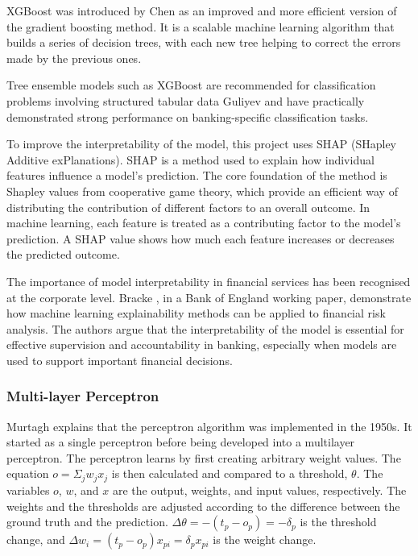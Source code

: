 \documentclass[ %
                    author={Natchalin Iwsakul \\[0.4em] Inkaphol Siriwongwattana \\[0.4em] Tanaphan Kummaraphat \\[0.6em] Patorn Srisupap},,
                supervisor={Fernando Moreno-Pino},
                    degree={MSc},
                     title={Propensity Modelling for SME Commercial Lending Using Open Public Data
},
                  subtitle={Companies House and GDELT as predictors of first-time borrowing},
                      type={},
                      year={2026}]{dissertation}
\begin{document}
XGBoost was introduced by Chen \cite{chen_xgboost_2016} as an
improved and more efficient version of the gradient
boosting method. It is a scalable machine learning
algorithm that builds a series of decision trees, with
each new tree helping to correct the errors made by
the previous ones.

Tree ensemble models such as XGBoost are recommended
for classification problems involving structured tabular
data Guliyev \citep{guliyev_customer_2021} and have practically
demonstrated strong performance on banking-specific
classification tasks.

To improve the interpretability of the model, this
project uses SHAP (SHapley Additive exPlanations).
SHAP is a method used to explain how individual
features influence a model's prediction. The core
foundation of the method is Shapley values from
cooperative game theory, which provide an efficient
way of distributing the contribution of different
factors to an overall outcome. In machine learning,
each feature is treated as a contributing factor to
the model's prediction. A SHAP value shows how much
each feature increases or decreases the predicted
outcome.

The importance of model interpretability in financial
services has been recognised at the corporate level.
Bracke \cite{bracke_machine_2019}, in a Bank of England working paper,
demonstrate how machine learning explainability methods
can be applied to financial risk analysis. The authors
argue that the interpretability of the model is
essential for effective supervision and accountability
in banking, especially when models are used to support
important financial decisions.

\subsubsection{Multi-layer Perceptron}
\label{sec:neuralnetwork}

Murtagh \cite{murtagh_multilayer_1991} explains that the perceptron algorithm was implemented in the 1950s. It started as a single perceptron before being developed into a multilayer perceptron. The perceptron learns by first creating arbitrary weight values. The equation \(o = \Sigma_j w_j x_j\) is then calculated and compared to a threshold, \(\theta\). The variables \(o\), \(w\), and \(x\) are the output, weights, and input values, respectively. The weights and the thresholds are adjusted according to the difference between the ground truth and the prediction. \(\Delta\theta = -(t_p - o_p) = -\delta_p\) is the threshold change, and \(\Delta w_i = (t_p - o_p)x_{pi} = \delta_px_{pi}\) is the weight change.
\end{document}
